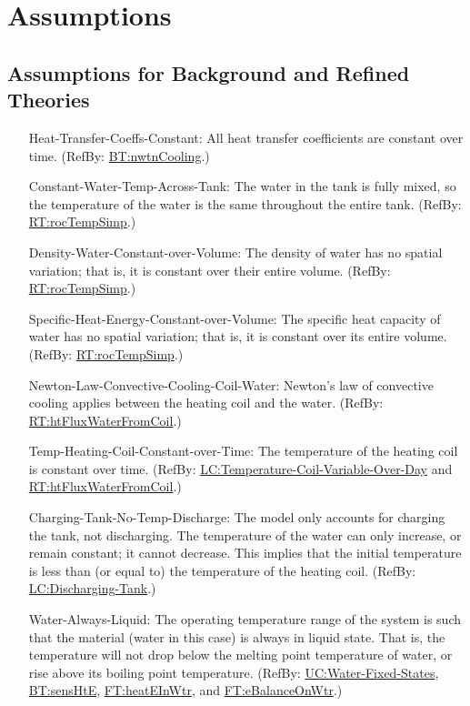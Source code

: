 \documentclass[12pt]{article}
\begin{document}

\section{Assumptions} \label{Sec:Assumps}

\subsection{Assumptions for Background and Refined Theories}

\begin{itemize}
\item[Heat-Transfer-Coeffs-Constant:\phantomsection\label{assumpHTCC}]{All heat transfer coefficients are constant over time. (RefBy: \hyperref[BT:nwtnCooling]{BT:nwtnCooling}.)}
\item[Constant-Water-Temp-Across-Tank:\phantomsection\label{assumpCWTAT}]{The water in the tank is fully mixed, so the temperature of the water is the same throughout the entire tank. (RefBy: \hyperref[RT:rocTempSimp]{RT:rocTempSimp}.)}
\item[Density-Water-Constant-over-Volume:\phantomsection\label{assumpDWCoW}]{The density of water has no spatial variation; that is, it is constant over their entire volume. (RefBy: \hyperref[RT:rocTempSimp]{RT:rocTempSimp}.)}
\item[Specific-Heat-Energy-Constant-over-Volume:\phantomsection\label{assumpSHECoW}]{The specific heat capacity of water has no spatial variation; that is, it is constant over its entire volume. (RefBy: \hyperref[RT:rocTempSimp]{RT:rocTempSimp}.)}
\item[Newton-Law-Convective-Cooling-Coil-Water:\phantomsection\label{assumpLCCCW}]{Newton's law of convective cooling applies between the heating coil and the water. (RefBy: \hyperref[RT:htFluxWaterFromCoil]{RT:htFluxWaterFromCoil}.)}
\item[Temp-Heating-Coil-Constant-over-Time:\phantomsection\label{assumpTHCCoT}]{The temperature of the heating coil is constant over time. (RefBy: \hyperref[likeChgTCVOD]{LC:Temperature-Coil-Variable-Over-Day} and \hyperref[RT:htFluxWaterFromCoil]{RT:htFluxWaterFromCoil}.)}
\item[Charging-Tank-No-Temp-Discharge:\phantomsection\label{assumpCTNTD}]{The model only accounts for charging the tank, not discharging. The temperature of the water can only increase, or remain constant; it cannot decrease. This implies that the initial temperature is less than (or equal to) the temperature of the heating coil. (RefBy: \hyperref[likeChgDT]{LC:Discharging-Tank}.)}
\item[Water-Always-Liquid:\phantomsection\label{assumpWAL}]{The operating temperature range of the system is such that the material (water in this case) is always in liquid state. That is, the temperature will not drop below the melting point temperature of water, or rise above its boiling point temperature. (RefBy: \hyperref[unlikeChgWFS]{UC:Water-Fixed-States}, \hyperref[BT:sensHtE]{BT:sensHtE}, \hyperref[FT:heatEInWtr]{FT:heatEInWtr}, and \hyperref[FT:eBalanceOnWtr]{FT:eBalanceOnWtr}.)}


\end{itemize}
\end{document}
